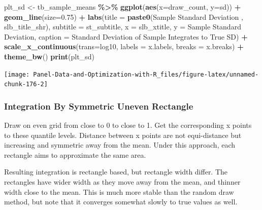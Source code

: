 \documentclass[
]{book}
\newenvironment{Shaded}{\begin{snugshade}}{\end{snugshade}}
\newcommand{\DataTypeTok}[1]{\textcolor[rgb]{0.13,0.29,0.53}{#1}}
\newcommand{\FloatTok}[1]{\textcolor[rgb]{0.00,0.00,0.81}{#1}}
\newcommand{\KeywordTok}[1]{\textcolor[rgb]{0.13,0.29,0.53}{\textbf{#1}}}
\newcommand{\NormalTok}[1]{#1}
\newcommand{\OperatorTok}[1]{\textcolor[rgb]{0.81,0.36,0.00}{\textbf{#1}}}
\newcommand{\StringTok}[1]{\textcolor[rgb]{0.31,0.60,0.02}{#1}}
\begin{document}
\begin{Shaded}
\begin{Highlighting}[]
\NormalTok{plt\_sd \textless{}{-}}\StringTok{ }\NormalTok{tb\_sample\_means }\OperatorTok{\%\textgreater{}\%}
\StringTok{  }\KeywordTok{ggplot}\NormalTok{(}\KeywordTok{aes}\NormalTok{(}\DataTypeTok{x=}\NormalTok{draw\_count, }\DataTypeTok{y=}\NormalTok{sd)) }\OperatorTok{+}
\StringTok{  }\KeywordTok{geom\_line}\NormalTok{(}\DataTypeTok{size=}\FloatTok{0.75}\NormalTok{) }\OperatorTok{+}
\StringTok{  }\KeywordTok{labs}\NormalTok{(}\DataTypeTok{title =} \KeywordTok{paste0}\NormalTok{(}\StringTok{\textquotesingle{}Sample Standard Deviation \textquotesingle{}}\NormalTok{, slb\_title\_shr),}
       \DataTypeTok{subtitle =}\NormalTok{ st\_subtitle,}
       \DataTypeTok{x =}\NormalTok{ slb\_xtitle,}
       \DataTypeTok{y =} \StringTok{\textquotesingle{}Sample Standard Deviation\textquotesingle{}}\NormalTok{,}
       \DataTypeTok{caption =} \StringTok{\textquotesingle{}Standard Deviation of Sample Integrates to True SD\textquotesingle{}}\NormalTok{) }\OperatorTok{+}
\StringTok{  }\KeywordTok{scale\_x\_continuous}\NormalTok{(}\DataTypeTok{trans=}\StringTok{\textquotesingle{}log10\textquotesingle{}}\NormalTok{, }\DataTypeTok{labels =}\NormalTok{ x.labels, }\DataTypeTok{breaks =}\NormalTok{ x.breaks) }\OperatorTok{+}
\StringTok{  }\KeywordTok{theme\_bw}\NormalTok{()}
\KeywordTok{print}\NormalTok{(plt\_sd)}
\end{Highlighting}
\end{Shaded}

\begin{center}\texttt{[image: Panel-Data-and-Optimization-with-R\_files/figure-latex/unnamed-chunk-176-2]} \end{center}

\hypertarget{integration-by-symmetric-uneven-rectangle}{%
\subsubsection{Integration By Symmetric Uneven Rectangle}\label{integration-by-symmetric-uneven-rectangle}}

Draw on even grid from close to 0 to close to 1. Get the corresponding x points to these quantile levels. Distance between x points are not equi-distance but increasing and symmetric away from the mean. Under this approach, each rectangle aims to approximate the same area.

Resulting integration is rectangle based, but rectangle width differ. The rectangles have wider width as they move away from the mean, and thinner width close to the mean. This is much more stable than the random draw method, but note that it converges somewhat slowly to true values as well.
\end{document}
